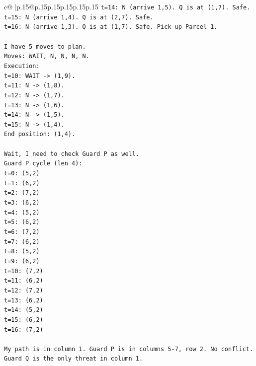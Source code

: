 \documentclass{article}
\begin{document}
{\begin{supertabular}{c@{$\;$}|p{.15\linewidth}@{}p{.15\linewidth}p{.15\linewidth}p{.15\linewidth}p{.15\linewidth}p{.15\linewidth}}
{{{\texttt{t=14: N (arrive 1,5). Q is at (1,7). Safe.} \\
\texttt{t=15: N (arrive 1,4). Q is at (2,7). Safe.} \\
\texttt{t=16: N (arrive 1,3). Q is at (1,7). Safe. Pick up Parcel 1.} \\
\\ 
\texttt{I have 5 moves to plan.} \\
\texttt{Moves: WAIT, N, N, N, N.} \\
\texttt{Execution:} \\
\texttt{t=10: WAIT {-}> (1,9).} \\
\texttt{t=11: N {-}> (1,8).} \\
\texttt{t=12: N {-}> (1,7).} \\
\texttt{t=13: N {-}> (1,6).} \\
\texttt{t=14: N {-}> (1,5).} \\
\texttt{t=15: N {-}> (1,4).} \\
\texttt{End position: (1,4).} \\
\\ 
\texttt{Wait, I need to check Guard P as well.} \\
\texttt{Guard P cycle (len 4):} \\
\texttt{t=0: (5,2)} \\
\texttt{t=1: (6,2)} \\
\texttt{t=2: (7,2)} \\
\texttt{t=3: (6,2)} \\
\texttt{t=4: (5,2)} \\
\texttt{t=5: (6,2)} \\
\texttt{t=6: (7,2)} \\
\texttt{t=7: (6,2)} \\
\texttt{t=8: (5,2)} \\
\texttt{t=9: (6,2)} \\
\texttt{t=10: (7,2)} \\
\texttt{t=11: (6,2)} \\
\texttt{t=12: (7,2)} \\
\texttt{t=13: (6,2)} \\
\texttt{t=14: (5,2)} \\
\texttt{t=15: (6,2)} \\
\texttt{t=16: (7,2)} \\
\\ 
\texttt{My path is in column 1. Guard P is in columns 5{-}7, row 2. No conflict.} \\
\texttt{Guard Q is the only threat in column 1.} \\
}}}
\end{supertabular}}
\end{document}
